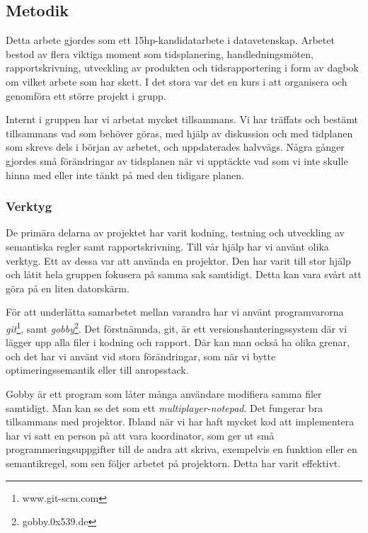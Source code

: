 \documentclass[../Appendix]{subfiles}
\begin{document}
\subsection{Metodik}

Detta arbete gjordes som ett 15hp-kandidatarbete i datavetenskap. Arbetet bestod
av flera viktiga moment som
    tidsplanering,
    handledningsmöten,
    rapportskrivning,
    utveckling av produkten och
    tidsrapportering i form av dagbok om vilket arbete som har skett. I det stora
var det en kurs i att organisera och genomföra ett större projekt i grupp.


Internt i gruppen har vi arbetat mycket tillsammans. Vi har träffats och
bestämt tillsammans vad som behöver göras, med hjälp av diskussion och med
tidplanen som skrevs dels i början av arbetet, och uppdaterades halvvägs. 
Några gånger gjordes små förändringar av tidsplanen när vi upptäckte
vad som vi inte skulle hinna med eller inte tänkt på med den tidigare planen.

\subsubsection{Verktyg}

    De primära delarna av projektet har varit kodning, testning och utveckling
av semantiska regler samt rapportskrivning. Till vår hjälp har vi använt
olika verktyg. Ett av dessa var att använda en projektor. Den har varit till
stor hjälp och låtit hela gruppen fokusera på samma sak samtidigt. Detta
kan vara svårt att göra på en liten datorskärm.

    För att underlätta samarbetet mellan varandra har vi använt programvarorna
\emph{git}\footnote{www.git-scm.com}, samt \emph{gobby}\footnote{gobby.0x539.de}.
Det förstnämnda, git, är ett versionshanteringssystem där vi lägger upp alla
filer i kodning och rapport. Där kan man också ha olika grenar, och det har 
vi använt vid stora förändringar, som när vi bytte optimeringssemantik eller
till anropsstack.

    Gobby är ett program som låter många användare modifiera samma filer
samtidigt. Man kan se det som ett \emph{multiplayer-notepad}. Det fungerar bra
tillsammans med projektor. Ibland när vi har haft mycket kod att implementera
har vi satt en person på att vara koordinator, som ger ut små
programmeringsuppgifter till de andra att skriva, exempelvis en funktion eller
en semantikregel, som sen följer arbetet på projektorn. Detta har varit 
effektivt.
\end{document}
